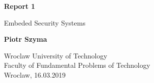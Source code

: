 
\begin{titlepage}
  \begin{center}
      \vspace*{1cm}

      \textbf{Report 1}

      \vspace{0.5cm}
       Embeded Security Systems

      \vspace{1.5cm}

      \textbf{Piotr Szyma}

      \vfill

      \vspace{0.8cm}

      Wroclaw University of Technology\\
      Faculty of Fundamental Problems of Technology\\
      Wroclaw, 16.03.2019

  \end{center}
\end{titlepage}